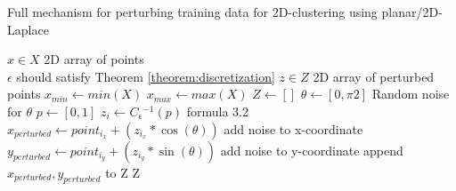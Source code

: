 \begin{algorithm}[H]
  \caption{Full mechanism for perturbing training data for 2D-clustering using planar/2D-Laplace \citep{DBLP:journals/corr/abs-1212-1984}}\label{alg:rq1}
  \begin{algorithmic}
    \Require $x \in X$  \Comment 2D array of points \\
    $\epsilon$ \Comment should satisfy Theorem \ref{theorem:discretization}
    \Ensure $z \in Z$ \Comment 2D array of perturbed points
    \State $x_{min} \gets min(X)$
    \State $x_{max} \gets max(X)$
    \State $Z \gets []$
    \State $\theta \gets [0, \pi2]$       \Comment Random noise for $\theta$
    \State $p \gets [0, 1]$
    \State $z_i \gets C{_\epsilon}{^{-1}}(p)$       \Comment formula 3.2
    \State $x_{perturbed} \gets point_{i_x} + (z_{i_x} * \cos(\theta)) $ \Comment add noise to x-coordinate
    \State $y_{perturbed} \gets point_{i_y} + (z_{i_y} * \sin(\theta)) $ \Comment add noise to y-coordinate
    \State append $x_{perturbed}, y_{perturbed}$ to Z
    \EndFor
    \State \Return Z
  \end{algorithmic}
  \label{alg:2d-laplace}
\end{algorithm}